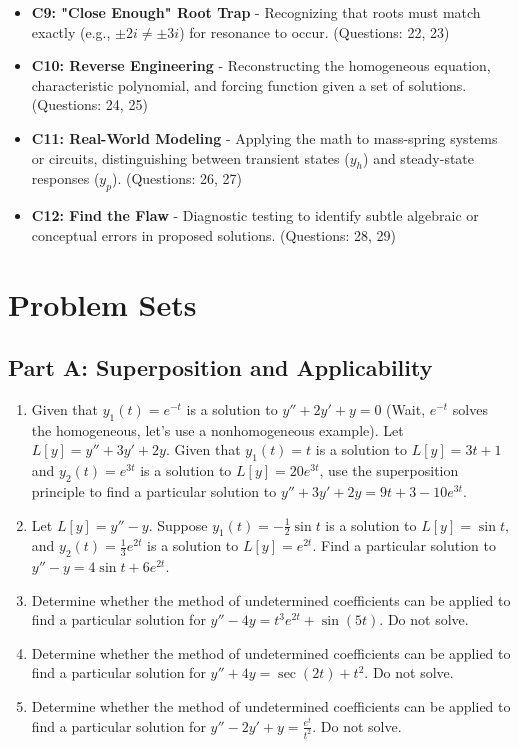 \documentclass[11pt]{article}
\begin{document}
\begin{itemize}
    \item \textbf{C9: "Close Enough" Root Trap} - Recognizing that roots must match exactly (e.g., $\pm 2i \neq \pm 3i$) for resonance to occur. (Questions: 22, 23)
    \item \textbf{C10: Reverse Engineering} - Reconstructing the homogeneous equation, characteristic polynomial, and forcing function given a set of solutions. (Questions: 24, 25)
    \item \textbf{C11: Real-World Modeling} - Applying the math to mass-spring systems or circuits, distinguishing between transient states ($y_h$) and steady-state responses ($y_p$). (Questions: 26, 27)
    \item \textbf{C12: Find the Flaw} - Diagnostic testing to identify subtle algebraic or conceptual errors in proposed solutions. (Questions: 28, 29)
\end{itemize}

\newpage

\section{Problem Sets}

\subsection*{Part A: Superposition and Applicability}
\begin{enumerate}
    \item Given that $y_1(t) = e^{-t}$ is a solution to $y'' + 2y' + y = 0$ (Wait, $e^{-t}$ solves the homogeneous, let's use a nonhomogeneous example). Let $L[y] = y'' + 3y' + 2y$. Given that $y_1(t) = t$ is a solution to $L[y] = 3t + 1$ and $y_2(t) = e^{3t}$ is a solution to $L[y] = 20e^{3t}$, use the superposition principle to find a particular solution to $y'' + 3y' + 2y = 9t + 3 - 10e^{3t}$.
    \item Let $L[y] = y'' - y$. Suppose $y_1(t) = -\frac{1}{2}\sin t$ is a solution to $L[y] = \sin t$, and $y_2(t) = \frac{1}{3}e^{2t}$ is a solution to $L[y] = e^{2t}$. Find a particular solution to $y'' - y = 4\sin t + 6e^{2t}$.
    \item Determine whether the method of undetermined coefficients can be applied to find a particular solution for $y'' - 4y = t^3 e^{2t} + \sin(5t)$. Do not solve.
    \item Determine whether the method of undetermined coefficients can be applied to find a particular solution for $y'' + 4y = \sec(2t) + t^2$. Do not solve.
    \item Determine whether the method of undetermined coefficients can be applied to find a particular solution for $y'' - 2y' + y = \frac{e^t}{t^2}$. Do not solve.
\end{enumerate}
\end{document}

